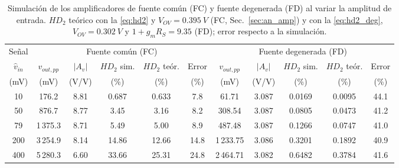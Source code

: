 \documentclass[conference]{IEEEtran}
\newcommand{\gm}{g_m}
\newcommand{\Vov}{V_{OV}}
\begin{document}
\begin{table}[htbp]
\centering
\caption{Simulación de los amplificadores de fuente común (FC) y fuente degenerada (FD) al variar la amplitud de entrada. $HD_2$ teórico con la \eqref{eq:hd2} y $\Vov=\SI{0.395}{V}$ (FC, Sec.~\ref{sec:an_amp}) y con la \eqref{eq:hd2_deg}, $\Vov=\SI{0.302}{V}$ y $1+\gm R_S=9.35$ (FD); error respecto a la simulación.}
\label{tab:sim}
\scriptsize
\renewcommand{\arraystretch}{1.03}
\setlength{\tabcolsep}{4pt}
\begin{tabular}{@{}c@{\hspace{12pt}}ccccc@{\hspace{12pt}}ccccc@{}}
\toprule
Señal & \multicolumn{5}{c}{Fuente común (FC)} & \multicolumn{5}{c}{Fuente degenerada (FD)} \\
\cmidrule(lr){2-6}\cmidrule(lr){7-11}
$\hat v_{in}$ & $v_{out,pp}$ & $|A_v|$ & $HD_2$ sim. & $HD_2$ teór. & Error & $v_{out,pp}$ & $|A_v|$ & $HD_2$ sim. & $HD_2$ teór. & Error \\
(mV) & (mV) & (V/V) & (\%) & (\%) & (\%) & (mV) & (V/V) & (\%) & (\%) & (\%) \\
\midrule
10 & 176.2 & 8.81 & 0.687 & 0.633 & 7.8 & 61.71 & 3.087 & 0.0169 & 0.0095 & 44.1 \\
50 & 876.7 & 8.77 & 3.45 & 3.16 & 8.2 & 308.54 & 3.087 & 0.0805 & 0.0473 & 41.2 \\
79 & 1\,375.3 & 8.71 & 5.49 & 5.00 & 8.9 & 487.48 & 3.087 & 0.1266 & 0.0747 & 41.0 \\
200 & 3\,254.9 & 8.14 & 14.86 & 12.66 & 14.8 & 1\,233.75 & 3.086 & 0.3201 & 0.1892 & 40.9 \\
400 & 5\,280.3 & 6.60 & 33.66 & 25.31 & 24.8 & 2\,464.71 & 3.082 & 0.6482 & 0.3784 & 41.6 \\
\bottomrule
\end{tabular}
\end{table}
\end{document}
